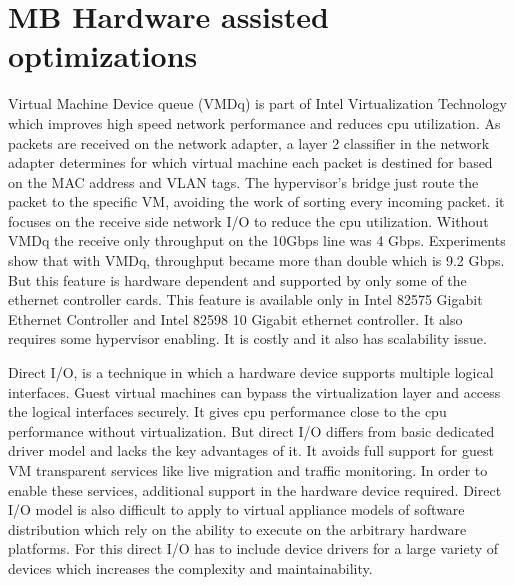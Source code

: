 \documentclass[a4paper,11pt]{report}
\begin{document}
\section{MB Hardware assisted optimizations}
Virtual Machine Device queue (VMDq) is part of Intel Virtualization Technology\cite{VMD} which improves high speed network performance and reduces cpu utilization. As packets are received on the network adapter, a layer 2 classifier in the network adapter determines for which virtual machine each packet is destined for based on the MAC address and VLAN tags. The hypervisor's bridge just route the packet to the specific VM,  avoiding the work of sorting every incoming packet. it focuses on the receive side network I/O to reduce the cpu utilization. Without VMDq the receive only throughput on the 10Gbps line was 4 Gbps. Experiments show that with VMDq, throughput became more than double which is 9.2 Gbps. But this feature is hardware dependent and supported by only some of the ethernet controller cards. This feature is available only in Intel 82575 Gigabit Ethernet Controller and Intel 82598 10 Gigabit ethernet controller. It also requires some hypervisor enabling. It is costly and it also has scalability issue.

Direct I/O\cite{DIO}, is a technique in which a hardware device supports multiple logical interfaces. Guest virtual machines can bypass the virtualization layer and access the logical interfaces securely. It gives cpu performance close to the cpu performance without virtualization. But direct I/O differs from basic dedicated driver model and lacks the key advantages of it. It avoids full support for guest VM transparent services like live migration and traffic monitoring. In order to enable these services, additional support in the hardware device required. Direct I/O model is also difficult to apply to virtual appliance models of software distribution which rely on the ability to execute on the arbitrary hardware platforms. For this direct I/O has to include device drivers for a large variety of devices which increases the complexity and maintainability.
\end{document}
